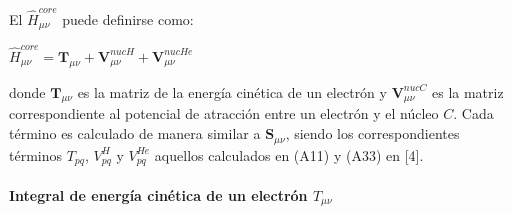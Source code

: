 \documentclass[
  letterpaper,
  DIV=11,
  numbers=noendperiod]{scrreprt}
\let\oldparagraph\paragraph
\renewcommand{\paragraph}[1]{\oldparagraph{#1}\mbox{}}
\begin{document}
El \(\hat{H}^{core}_{\mu \nu}\) puede definirse como:

\(\hat{H}^{core}_{\mu \nu} = \textbf{T}_{\mu \nu} + \textbf{V}^{nucH}_{\mu \nu} + \textbf{V}^{nucHe}_{\mu \nu}\)

donde \(\textbf{T}_{\mu \nu}\) es la matriz de la energía cinética de un
electrón y \(\textbf{V}^{nucC}_{\mu \nu}\) es la matriz correspondiente
al potencial de atracción entre un electrón y el núcleo \(C\). Cada
término es calculado de manera similar a \(\mathbf{S}_{\mu \nu}\),
siendo los correspondientes términos \(T_{pq}\), \(V^H_{pq}\) y
\(V^{He}_{pq}\) aquellos calculados en (A11) y (A33) en {[}4{]}.

\hypertarget{integral-de-energuxeda-cinuxe9tica-de-un-electruxf3n-t_mu-nu}{%
\paragraph{\texorpdfstring{Integral de energía cinética de un electrón
\(T_{\mu \nu}\)}{Integral de energía cinética de un electrón T\_\{\textbackslash mu \textbackslash nu\}}}\label{integral-de-energuxeda-cinuxe9tica-de-un-electruxf3n-t_mu-nu}}
\end{document}
